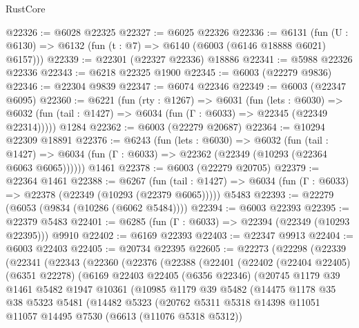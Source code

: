\begin{lexlean}{RustCore}
\begin{coremodule}
@22326 := @6028 @22325
@22327 := @6025 @22326
@22336 := @6131
    (fun (U : @6130) => @6132 (fun (t : @7) => @6140 (@6003 (@6146 @18888 @6021) @6157)))
@22339 := @22301 (@22327 @22336) @18886
@22341 := @5988 @22326 @22336
@22343 := @6218 @22325 @1900
@22345 := @6003 (@22279 @9836)
@22346 := @22304 @9839
@22347 := @6074 @22346
@22349 := @6003 (@22347 @6095)
@22360 := @6221
    (fun (rty : @1267) =>
    @6031
      (fun (lets : @6030) =>
      @6032 (fun (tail : @1427) => @6034 (fun (Γ : @6033) => @22345 (@22349 @22314)))))
    @1284
@22362 := @6003 (@22279 @20687)
@22364 := @10294 @22309 @18891
@22376 := @6243
    (fun (lets : @6030) =>
    @6032
      (fun (tail : @1427) =>
      @6034 (fun (Γ : @6033) => @22362 (@22349 (@10293 (@22364 @6063 @6065))))))
    @1461
@22378 := @6003 (@22279 @20705)
@22379 := @22364 @1461
@22388 := @6267
    (fun (tail : @1427) => @6034 (fun (Γ : @6033) => @22378 (@22349 (@10293 (@22379 @6065)))))
    @5483
@22393 := @22279 (@6053 (@9834 (@10286 (@6062 @5484))))
@22394 := @6003 @22393
@22395 := @22379 @5483
@22401 := @6285 (fun (Γ : @6033) => @22394 (@22349 (@10293 @22395))) @9910
@22402 := @6169 @22393
@22403 := @22347 @9913
@22404 := @6003 @22403
@22405 := @20734 @22395
@22605 := @22273
    (@22298
      (@22339
        (@22341
          (@22343
            (@22360
              (@22376
                (@22388
                  (@22401
                    (@22402
                      (@22404 @22405)
                      (@6351 @22278)
                      (@6169
                        @22403
                        @22405
                        (@6356 @22346)
                        (@20745
                          @1179
                          @39
                          @1461
                          @5482
                          @1947
                          @10361
                          (@10985
                            @1179
                            @39
                            @5482
                            (@14475
                              @1178
                              @35
                              @38
                              @5323
                              @5481
                              (@14482
                                @5323
                                (@20762
                                  @5311
                                  @5318
                                  @14398
                                  @11051
                                  @11057
                                  @14495
                                  @7530
                                  (@6613 (@11076 @5318 @5312))

\end{coremodule}
\end{lexlean}
